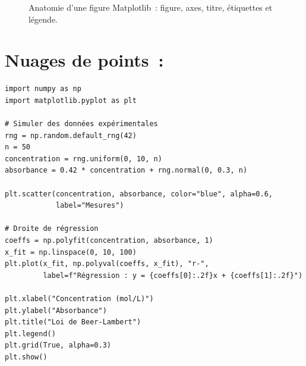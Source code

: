 \begin{figure}[ht]
\centering
{}
\caption{Anatomie d'une figure Matplotlib~: figure, axes, titre, \'etiquettes et l\'egende.}
\label{fig:matplotlib-anatomie}
\end{figure}

\section{Nuages de points~: }

\begin{codeblock}[title=\textbf{Python}]
\begin{verbatim}
import numpy as np
import matplotlib.pyplot as plt

# Simuler des données expérimentales
rng = np.random.default_rng(42)
n = 50
concentration = rng.uniform(0, 10, n)
absorbance = 0.42 * concentration + rng.normal(0, 0.3, n)

plt.scatter(concentration, absorbance, color="blue", alpha=0.6,
            label="Mesures")

# Droite de régression
coeffs = np.polyfit(concentration, absorbance, 1)
x_fit = np.linspace(0, 10, 100)
plt.plot(x_fit, np.polyval(coeffs, x_fit), "r-",
         label=f"Régression : y = {coeffs[0]:.2f}x + {coeffs[1]:.2f}")

plt.xlabel("Concentration (mol/L)")
plt.ylabel("Absorbance")
plt.title("Loi de Beer-Lambert")
plt.legend()
plt.grid(True, alpha=0.3)
plt.show()
\end{verbatim}
\end{codeblock}

